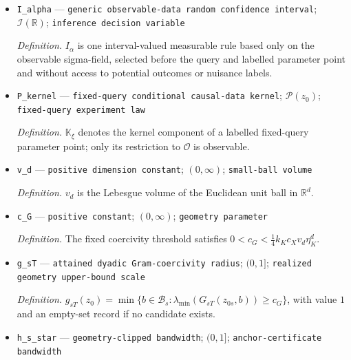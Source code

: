 \documentclass{article}
\begin{document}
\begin{itemize}
  \par\smallskip\noindent\emph{Definition.} In \(\mathfrak E_X(z_0,\Sigma)\), \(\widetilde\tau\) is measurable in the observations and the known specifications \(X,z_0,\Sigma\), and is selected before the unknown labelled point.  In an outer fixed-query minimax display it denotes one \(\mathcal O\)-measurable rule selected before the unknown donor mean \(z_0\) and labelled kernel.  It never accesses potential outcomes or nuisance labels.
  \item \texttt{I\_\allowbreak{}alpha} --- \texttt{generic observable-\allowbreak{}data random confidence interval}; \(\mathcal I(\mathbb R)\); \texttt{inference decision variable}
  \par\smallskip\noindent\emph{Definition.} \(I_\alpha\) is one interval-valued measurable rule based only on the observable sigma-field, selected before the query and labelled parameter point and without access to potential outcomes or nuisance labels.
  \item \texttt{P\_\allowbreak{}kernel} --- \texttt{fixed-\allowbreak{}query conditional causal-\allowbreak{}data kernel}; \(\mathcal P(z_0)\); \texttt{fixed-\allowbreak{}query experiment law}
  \par\smallskip\noindent\emph{Definition.} \(\mathbb K_\xi\) denotes the kernel component of a labelled fixed-query parameter point; only its restriction to \(\mathcal O\) is observable.
  \item \texttt{v\_\allowbreak{}d} --- \texttt{positive dimension constant}; \((0,\infty)\); \texttt{small-\allowbreak{}ball volume}
  \par\smallskip\noindent\emph{Definition.} \(v_d\) is the Lebesgue volume of the Euclidean unit ball in \(\mathbb R^d\).
  \item \texttt{c\_\allowbreak{}G} --- \texttt{positive constant}; \((0,\infty)\); \texttt{geometry parameter}
  \par\smallskip\noindent\emph{Definition.} The fixed coercivity threshold satisfies \(0<c_G<\tfrac14 k_Kc_Xv_d\eta_K^d\).
  \item \texttt{g\_\allowbreak{}sT} --- \texttt{attained dyadic Gram-\allowbreak{}coercivity radius}; \((0,1]\); \texttt{realized geometry upper-\allowbreak{}bound scale}
  \par\smallskip\noindent\emph{Definition.} \(g_{sT}(z_0)=\min\{b\in\mathcal B_s:\lambda_{\min}(G_{sT}(z_{0s},b))\ge c_G\}\), with value \(1\) and an empty-set record if no candidate exists.
  \item \texttt{h\_\allowbreak{}s\_\allowbreak{}star} --- \texttt{geometry-\allowbreak{}clipped bandwidth}; \((0,1]\); \texttt{anchor-\allowbreak{}certificate bandwidth}

\end{itemize}
\end{document}
